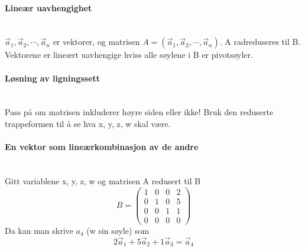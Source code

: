 \paragraph{Lineær uavhengighet} \mbox{} \\
$\vec{a}_1, \vec{a}_2, \cdots, \vec{a}_n$ er vektorer,
og matrisen $A = (\vec{a}_1, \vec{a}_2, \cdots, \vec{a}_n)$.
A radreduseres til B.
Vektorene er lineært uavhengige hviss alle søylene i B er pivotsøyler.



\paragraph{Løsning av ligningssett} \mbox{} \\
Pass på om matrisen inkluderer høyre siden eller ikke!
Bruk den reduserte trappeformen til å se hva x, y, z, w skal være.



\paragraph{En vektor som lineærkombinasjon av de andre} \mbox{} \\
Gitt variablene x, y, z, w og matrisen A redusert til B
$$B = \begin{pmatrix}
      1 & 0 & 0 & 2 \\
      0 & 1 & 0 & 5 \\
      0 & 0 & 1 & 1 \\
      0 & 0 & 0 & 0
      \end{pmatrix}$$
Da kan man skrive $a_4$ (w sin søyle) som
$$2\vec{a}_1 + 5\vec{a}_2 + 1\vec{a}_3 = \vec{a}_4$$
